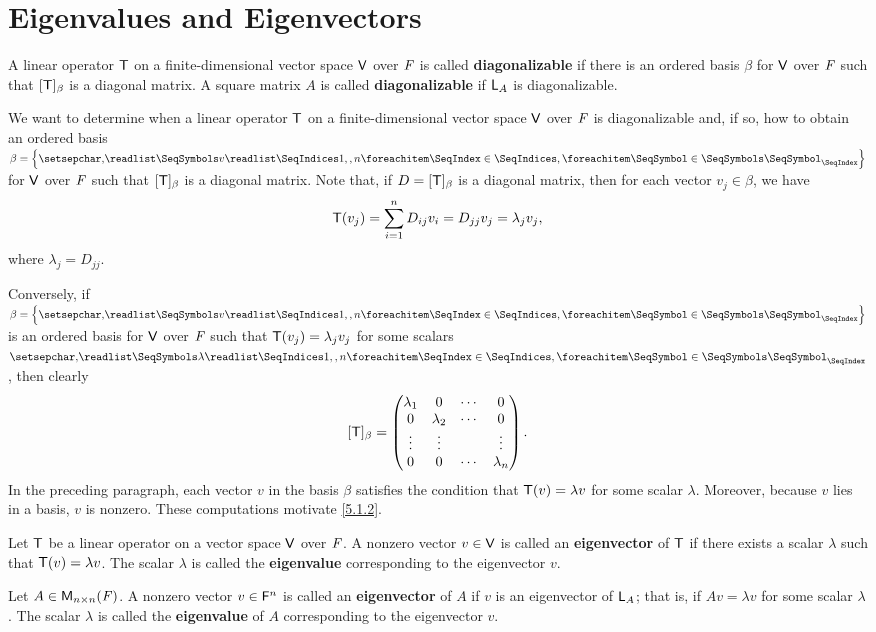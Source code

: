 \section{Eigenvalues and Eigenvectors}\label{sec:5.1}

\begin{defn}\label{5.1.1}
  A linear operator \(\mathsf{T}\) on a finite-dimensional vector space \(\mathsf{V}\) over \(\mathit{F}\) is called \textbf{diagonalizable} if there is an ordered basis \(\beta\) for \(\mathsf{V}\) over \(\mathit{F}\) such that \([\mathsf{T}]_{\beta}\) is a diagonal matrix.
  A square matrix \(A\) is called \textbf{diagonalizable} if \(\mathsf{L}_A\) is diagonalizable.
\end{defn}

\begin{note}
  We want to determine when a linear operator \(\mathsf{T}\) on a finite-dimensional vector space \(\mathsf{V}\) over \(\mathit{F}\) is diagonalizable and, if so, how to obtain an ordered basis \(\beta = \set{\seq{v}{1,,n}}\) for \(\mathsf{V}\) over \(\mathit{F}\) such that \([\mathsf{T}]_{\beta}\) is a diagonal matrix.
  Note that, if \(D = [\mathsf{T}]_{\beta}\) is a diagonal matrix, then for each vector \(v_j \in \beta\), we have
  \[
    \mathsf{T}(v_j) = \sum_{i = 1}^n D_{i j} v_i = D_{j j} v_j = \lambda_j v_j,
  \]
  where \(\lambda_j = D_{j j}\).

  Conversely, if \(\beta = \set{\seq{v}{1,,n}}\) is an ordered basis for \(\mathsf{V}\) over \(\mathit{F}\) such that \(\mathsf{T}(v_j) = \lambda_j v_j\) for some scalars \(\seq{\lambda}{1,,n}\), then clearly
  \[
    [\mathsf{T}]_{\beta} = \begin{pmatrix}
      \lambda_1 & 0         & \cdots & 0         \\
      0         & \lambda_2 & \cdots & 0         \\
      \vdots    & \vdots    &        & \vdots    \\
      0         & 0         & \cdots & \lambda_n
    \end{pmatrix}.
  \]
  In the preceding paragraph, each vector \(v\) in the basis \(\beta\) satisfies the condition that \(\mathsf{T}(v) = \lambda v\) for some scalar \(\lambda\).
  Moreover, because \(v\) lies in a basis, \(v\) is nonzero.
  These computations motivate \cref{5.1.2}.
\end{note}

\begin{defn}\label{5.1.2}
  Let \(\mathsf{T}\) be a linear operator on a vector space \(\mathsf{V}\) over \(\mathit{F}\).
  A nonzero vector \(v \in \mathsf{V}\) is called an \textbf{eigenvector} of \(\mathsf{T}\) if there exists a scalar \(\lambda\) such that \(\mathsf{T}(v) = \lambda v\).
  The scalar \(\lambda\) is called the \textbf{eigenvalue} corresponding to the eigenvector \(v\).

  Let \(A \in \mathsf{M}_{{n} \times n}({\mathit{F}})\).
  A nonzero vector \(v \in \mathsf{F}^n\) is called an \textbf{eigenvector} of \(A\) if \(v\) is an eigenvector of \(\mathsf{L}_A\);
  that is, if \(Av = \lambda v\) for some scalar \(\lambda\).
  The scalar \(\lambda\) is called the \textbf{eigenvalue} of \(A\) corresponding to the eigenvector \(v\).
\end{defn}

